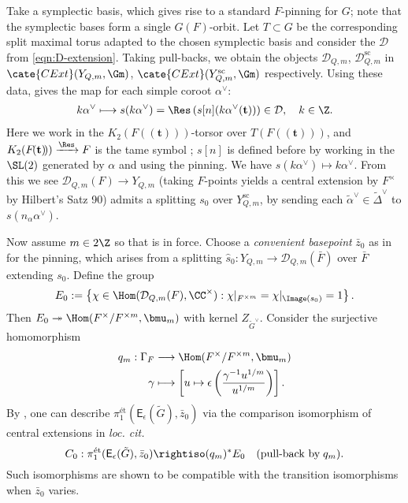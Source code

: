 \documentclass[a4paper,10pt]{article}
\begin{document}
Take a symplectic basis, which gives rise to a standard $F$-pinning for $G$; note that the symplectic bases form a single $G(F)$-orbit. Let $T \subset G$ be the corresponding split maximal torus adapted to the chosen symplectic basis and consider the $\mathcal{D}$ from \eqref{eqn:D-extension}. Taking pull-backs, we obtain the objects $\mathcal{D}_{Q,m}$, $\mathcal{D}^\text{sc}_{Q,m}$ in $\cate{CExt}(Y_{Q,m}, \Gm)$, $\cate{CExt}(Y_{Q,m}^\text{sc}, \Gm)$ respectively. Using these data, \cite[\S 11.7]{BD01} gives the map for each simple coroot $\alpha^\vee$: 
\begin{gather*}
	k\alpha^\vee \longmapsto s(k\alpha^\vee) = \Res\left( s[n](k\alpha^\vee(\mathbf{t})) \right) \in \mathcal{D}, \quad k \in \Z.
\end{gather*}
Here we work in the $K_2(F(\!(\mathbf{t})\!))$-torsor over $T(F(\!(\mathbf{t})\!))$, and $K_2(F\!(\mathbf{t})\!)) \xrightarrow{\Res} F$ is the tame symbol \cite[(11.1.8)]{BD01}; $s[n]$ is defined before \cite[(11.1.3)]{BD01} by working in the $\SL(2)$ generated by $\alpha$ and using the pinning. We have $s(k\alpha^\vee) \mapsto k\alpha^\vee$. From this we see $\mathcal{D}_{Q,m}(F) \to Y_{Q,m}$ (taking $F$-points yields a central extension by $F^\times$ by Hilbert's Satz 90) admits a splitting $s_0$ over $Y_{Q,m}^\text{sc}$, by sending each $\tilde{\alpha}^\vee \in \tilde{\Delta}^\vee$ to $s(n_\alpha \alpha^\vee)$.

Now assume $m \in 2\Z$ so that \cite[Assumption 3.1]{Weis17} is in force. Choose a \emph{convenient basepoint} $\bar{z}_0$ as in \cite[\S 1.1]{Weis17b} for the pinning, which arises from a splitting $\hat{s}_0: Y_{Q,m} \to \mathcal{D}_{Q,m}(\bar{F})$ over $\bar{F}$ extending $s_0$. Define the group
\[ E_0 := \left\{ \chi \in \Hom(\mathcal{D}_{Q,m}(F), \CC^\times): \chi|_{F^{\times m}} = \chi|_{\Image(s_0)} = 1 \right\}. \]
Then $E_0 \twoheadrightarrow \Hom(F^\times/F^{\times m}, \bmu_m)$ with kernel $Z_{\tilde{G}^\vee}$. Consider the surjective homomorphism
\begin{align*}
	q_m: \Gamma_F & \longrightarrow \Hom(F^\times/F^{\times m}, \bmu_m) \\
	\gamma & \longmapsto \left[ u \mapsto \epsilon\left(\frac{\gamma^{-1}u^{1/m}}{u^{1/m}}\right)\right].
\end{align*}
By \cite[\S\S 2.1--2.3]{Weis17b}, one can describe $\pi_1^{\text{ét}}(\mathsf{E}_\epsilon(\tilde{G}), \bar{z}_0)$ via the comparison isomorphism of central extensions in \textit{loc. cit.}
\[ C_0: \pi_1^{\text{ét}}(\mathsf{E}_\epsilon(\tilde{G}), \bar{z}_0) \rightiso (q_m)^* E_0 \quad (\text{pull-back by}\; q_m). \]
Such isomorphisms are shown to be compatible with the transition isomorphisms when $\bar{z}_0$ varies.
\end{document}
